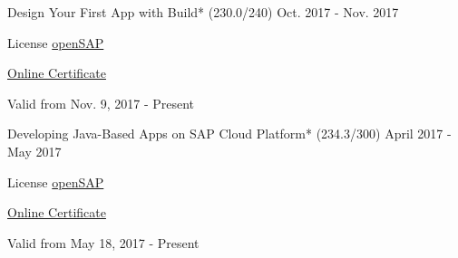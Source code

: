 \begin{cventries}
  \cventry
    {Design Your First App with Build* (230.0/240)} %
    {} %
    {} %
    {Oct. 2017 - Nov. 2017} %
    {
	    \begin{cvitems} %
        \item {License \href{https://open.sap.com/}{openSAP}} %
        \item {\href{https://open.sap.com/verify/xoban-setyz-vogaf-leryz-lufor}{Online Certificate}} %
        \item {Valid from Nov. 9, 2017 - Present} %
      \end{cvitems}
    }      
	  
	  
  \cventry
    {Developing Java-Based Apps on SAP Cloud Platform* (234.3/300)} %
    {} %
    {} %
    {April 2017 - May 2017} %
    {
	    \begin{cvitems} %
        \item {License \href{https://open.sap.com/}{openSAP}} %
        \item {\href{https://open.sap.com/verify/xuhes-rimus-bikon-roper-hicom}{Online Certificate}} %
        \item {Valid from May 18, 2017 - Present} %
      \end{cvitems}
    }    


\end{cventries}
